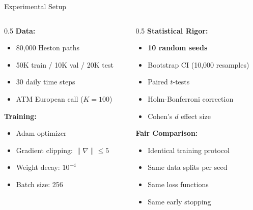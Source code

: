 \documentclass[aspectratio=169,11pt]{beamer}
\begin{document}
\begin{frame}{Experimental Setup}
\begin{columns}
\begin{column}{0.5\textwidth}
\textbf{Data:}
\begin{itemize}
    \item 80,000 Heston paths
    \item 50K train / 10K val / 20K test
    \item 30 daily time steps
    \item ATM European call ($K=100$)
\end{itemize}

\vspace{0.3cm}
\textbf{Training:}
\begin{itemize}
    \item Adam optimizer
    \item Gradient clipping: $\|\nabla\| \leq 5$
    \item Weight decay: $10^{-4}$
    \item Batch size: 256
\end{itemize}
\end{column}
\begin{column}{0.5\textwidth}
\textbf{Statistical Rigor:}
\begin{itemize}
    \item \textbf{10 random seeds}
    \item Bootstrap CI (10,000 resamples)
    \item Paired $t$-tests
    \item Holm-Bonferroni correction
    \item Cohen's $d$ effect size
\end{itemize}

\vspace{0.3cm}
\textbf{Fair Comparison:}
\begin{itemize}
    \item Identical training protocol
    \item Same data splits per seed
    \item Same loss functions
    \item Same early stopping
\end{itemize}
\end{column}
\end{columns}
\end{frame}
\end{document}
